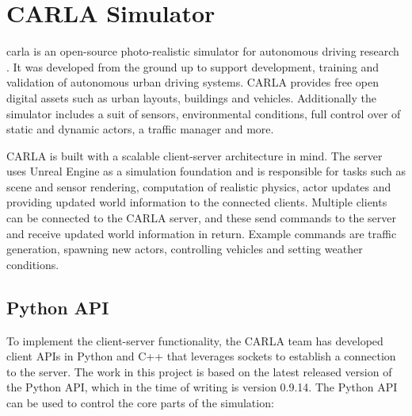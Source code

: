 \section{CARLA Simulator}

\acrfull{carla} is an open-source photo-realistic simulator for autonomous driving research \cite{introducing-carla-paper}. It was developed from the ground up to support development, training and validation of autonomous urban driving systems. CARLA provides free open digital assets such as urban layouts, buildings and vehicles. Additionally the simulator includes a suit of sensors, environmental conditions, full control over of static and dynamic actors, a traffic manager and more.

CARLA is built with a scalable client-server architecture in mind. The server uses Unreal Engine \cite{unrealengine} as a simulation foundation and is responsible for tasks such as scene and sensor rendering, computation of realistic physics, actor updates and providing updated world information to the connected clients. Multiple clients can be connected to the CARLA server, and these send commands to the server and receive updated world information in return. Example commands are traffic generation, spawning new actors, controlling vehicles and setting weather conditions.

\subsection{Python API}
To implement the client-server functionality, the CARLA team has developed client APIs in Python \cite{carla-python-api} and C++ \cite{carla-cplusplus-api} that leverages sockets to establish a connection to the server. The work in this project is based on the latest released version of the Python API, which in the time of writing is version 0.9.14. The Python API can be used to control the core parts of the simulation: 

